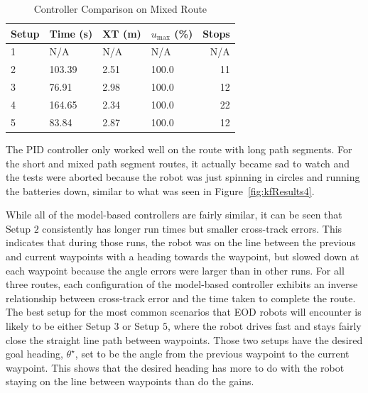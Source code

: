 \begin{table}[ht!]
\caption{Controller Comparison on Mixed Route}
\small
\centering
\begin{tabular}{@{}llllr@{}} \toprule
Setup & Time (s) & XT (m) & $u_{\text{max}}$ (\%) & Stops \\ \midrule
1     & N/A      & N/A    & N/A                   & N/A   \\
2     & 103.39   & 2.51   & 100.0                 & 11    \\
3     & 76.91    & 2.98   & 100.0                 & 12    \\
4     & 164.65   & 2.34   & 100.0                 & 22    \\
5     & 83.84    & 2.87   & 100.0                 & 12    \\ \bottomrule
\end{tabular}%
\label{tab:resultsControllersMixed}
\end{table}

The PID controller only worked well on the route with long path segments.
For the short and mixed path segment routes, it actually became sad to watch and the tests were aborted because the robot was just spinning in circles and running the batteries down, similar to what was seen in Figure~\ref{fig:kfResults4}.

While all of the model-based controllers are fairly similar, it can be seen that Setup $2$ consistently has longer run times but smaller cross-track errors.
This indicates that during those runs, the robot was on the line between the previous and current waypoints with a heading towards the waypoint, but slowed down at each waypoint because the angle errors were larger than in other runs.
For all three routes, each configuration of the model-based controller exhibits an inverse relationship between cross-track error and the time taken to complete the route.
The best setup for the most common scenarios that EOD robots will encounter is likely to be either Setup $3$ or Setup $5$, where the robot drives fast and stays fairly close the straight line path between waypoints.
Those two setups have the desired goal heading, $\theta^\star$, set to be the angle from the previous waypoint to the current waypoint.
This shows that the desired heading has more to do with the robot staying on the line between waypoints than do the gains.
